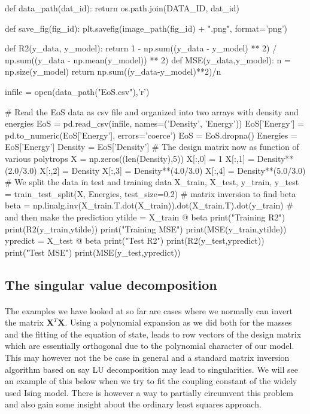 \documentclass[%
oneside,                 %
final,                   %
10pt]{article}
\begin{document}
def data_path(dat_id):
    return os.path.join(DATA_ID, dat_id)

def save_fig(fig_id):
    plt.savefig(image_path(fig_id) + ".png", format='png')

def R2(y_data, y_model):
    return 1 - np.sum((y_data - y_model) ** 2) / np.sum((y_data - np.mean(y_model)) ** 2)
def MSE(y_data,y_model):
    n = np.size(y_model)
    return np.sum((y_data-y_model)**2)/n

infile = open(data_path("EoS.csv"),'r')

# Read the EoS data as  csv file and organized into two arrays with density and energies
EoS = pd.read_csv(infile, names=('Density', 'Energy'))
EoS['Energy'] = pd.to_numeric(EoS['Energy'], errors='coerce')
EoS = EoS.dropna()
Energies = EoS['Energy']
Density = EoS['Density']
#  The design matrix now as function of various polytrops
X = np.zeros((len(Density),5))
X[:,0] = 1
X[:,1] = Density**(2.0/3.0)
X[:,2] = Density
X[:,3] = Density**(4.0/3.0)
X[:,4] = Density**(5.0/3.0)
# We split the data in test and training data
X_train, X_test, y_train, y_test = train_test_split(X, Energies, test_size=0.2)
# matrix inversion to find beta
beta = np.linalg.inv(X_train.T.dot(X_train)).dot(X_train.T).dot(y_train)
# and then make the prediction
ytilde = X_train @ beta
print("Training R2")
print(R2(y_train,ytilde))
print("Training MSE")
print(MSE(y_train,ytilde))
ypredict = X_test @ beta
print("Test R2")
print(R2(y_test,ypredict))
print("Test MSE")
print(MSE(y_test,ypredict))
\epycod


\subsection{The singular value decomposition}


\paragraph{}

The examples we have looked at so far are cases where we normally can
invert the matrix $\bm{X}^T\bm{X}$. Using a polynomial expansion as we
did both for the masses and the fitting of the equation of state,
leads to row vectors of the design matrix which are essentially
orthogonal due to the polynomial character of our model. This may
however not the be case in general and a standard matrix inversion
algorithm based on say LU decomposition may lead to singularities. We will see an example of this below when we try to fit
the coupling constant of the widely used Ising model. 
There is however a way to partially circumvent this problem and also gain some insight about the ordinary least squares approach. 
\end{document}
